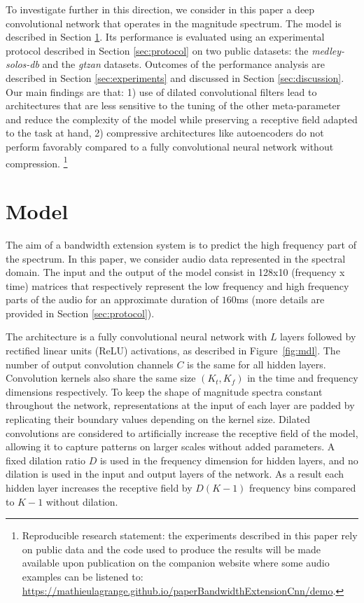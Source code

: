 \documentclass{article}
\begin{document}
To investigate further in this direction, we consider in this paper a deep convolutional network that operates in the magnitude spectrum. The model is described in Section \ref{sec:model}. Its performance is evaluated using an experimental protocol described in Section \ref{sec:protocol} on two public datasets: the \textit{medley-solos-db} and the \textit{gtzan} datasets. Outcomes of the performance analysis are described in Section \ref{sec:experiments} and discussed in Section \ref{sec:discussion}. Our main findings are that: 1) use of dilated convolutional filters lead to architectures that are less sensitive to the tuning of the other meta-parameter and reduce the complexity of the model while preserving a receptive field adapted to the task at hand, 2) compressive architectures like autoencoders do not perform favorably compared to a fully convolutional neural network without compression. \footnote{Reproducible research statement: the experiments described in this paper rely on public data and the code used to produce the results will be made available upon publication on the companion website where some audio examples can be listened to: \url{https://mathieulagrange.github.io/paperBandwidthExtensionCnn/demo}.}

\section{Model}
\label{sec:model}

The aim of a bandwidth extension system is to predict the high frequency part of the spectrum. In this paper, we consider audio data represented in the spectral domain. The input and the output of the model consist in 128x10 (frequency x time) matrices that respectively represent the low frequency and high frequency parts of the audio for an approximate duration of $160$ms (more details are provided in Section \ref{sec:protocol}).

The architecture is a fully convolutional neural network \cite{long2015fully} with $L$ layers followed by rectified linear units (ReLU) activations, as described in Figure~\ref{fig:mdl}. The number of output convolution channels $C$ is the same for all hidden layers. Convolution kernels also share the same size $(K_t, K_f)$ in the time and frequency dimensions respectively. To keep the shape of magnitude spectra constant throughout the network, representations at the input of each layer are padded by replicating their boundary values depending on the kernel size. Dilated convolutions \cite{yu2016multi, oord2016wavenet} are considered to artificially increase the receptive field of the model, allowing it to capture patterns on larger scales without added parameters. A fixed dilation ratio $D$ is used in the frequency dimension for hidden layers, and no dilation is used in the input and output layers of the network. As a result each hidden layer increases the receptive field by $D(K-1)$ frequency bins compared to $K-1$ without dilation.
\end{document}
